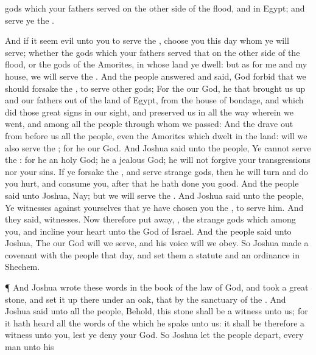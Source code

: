 {gods which your
fathers
served on the other
side of the
flood, and in
Egypt; and
serve ye the
{}.
\par }{\PP {}And if it seem
evil unto
you to
serve the
{},
choose you this
day
whom ye will
serve; whether the
gods which your
fathers
served that
{} on the other
side of the
flood, or the
gods of the
Amorites, in whose
land ye
dwell: but as for me and my
house, we will
serve the
{}.
And the
people
answered and
said, God
forbid that we should
forsake the
{}, to
serve
other
gods;
For the
{} our
God, he
{} that brought us
up and our
fathers out of the
land of
Egypt, from the
house of
bondage, and which
did those
great
signs in our
sight, and
preserved us in all the
way wherein we
went, and among all the
people
through whom we
passed:
And the
{} drave
out from
before us all the
people, even the
Amorites which
dwelt in the
land:
{} will we also
serve the
{}; for he
{} our
God.
And
Joshua
said unto the
people, Ye
cannot
serve the
{}: for he
{} an
holy
God; he
{} a
jealous
God; he will not
forgive your
transgressions nor your
sins.
If ye
forsake the
{}, and
serve
strange
gods, then he will
turn and do you
hurt, and
consume you,
after that he hath done you
good.
And the
people
said unto
Joshua, Nay; but we will
serve the
{}.
And
Joshua
said unto the
people, Ye
{}
witnesses against yourselves that ye have
chosen you the
{}, to
serve him. And they
said,
{}
witnesses.
Now therefore put
away,
{}, the
strange
gods which
{}
among you, and
incline your
heart unto the
{}
God of
Israel.
And the
people
said unto
Joshua, The
{} our
God will we
serve, and his
voice will we
obey.
So
Joshua
made a
covenant with the
people that
day, and
set them a
statute and an
ordinance in
Shechem.
\par }{\PP {}¶ And
Joshua
wrote these
words in the
book of the
law of
God, and
took a
great
stone, and set it
up there under an
oak, that
{} by the
sanctuary of the
{}.
And
Joshua
said unto all the
people, Behold, this
stone shall be a
witness unto us; for it hath
heard all the
words of the
{} which he
spake unto us: it shall be therefore a
witness unto you, lest ye
deny your
God.
So
Joshua let the
people
depart, every
man unto his
}
